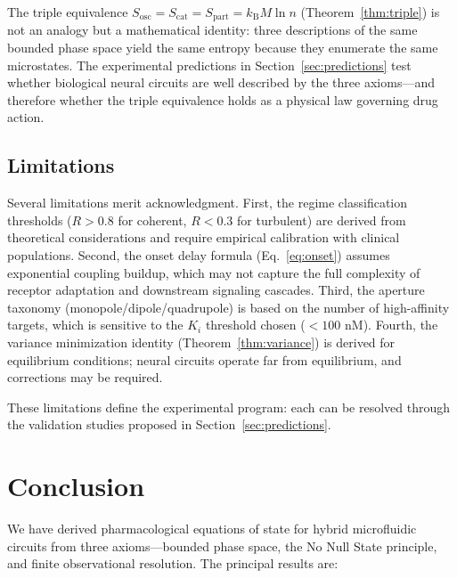 \documentclass[twocolumn,10pt]{article}
\theoremstyle{remark}
\newcommand{\Sosc}{S_{\mathrm{osc}}}
\newcommand{\Scat}{S_{\mathrm{cat}}}
\newcommand{\Spart}{S_{\mathrm{part}}}
\newcommand{\kB}{k_{\mathrm{B}}}
\newcommand{\Rorder}{R}
\begin{document}
The triple equivalence $\Sosc = \Scat = \Spart = \kB M \ln n$ (Theorem~\ref{thm:triple}) is not an analogy but a mathematical identity: three descriptions of the same bounded phase space yield the same entropy because they enumerate the same microstates. The experimental predictions in Section~\ref{sec:predictions} test whether biological neural circuits are well described by the three axioms---and therefore whether the triple equivalence holds as a physical law governing drug action.

\subsection{Limitations}

Several limitations merit acknowledgment. First, the regime classification thresholds ($\Rorder > 0.8$ for coherent, $\Rorder < 0.3$ for turbulent) are derived from theoretical considerations and require empirical calibration with clinical populations. Second, the onset delay formula (Eq.~\ref{eq:onset}) assumes exponential coupling buildup, which may not capture the full complexity of receptor adaptation and downstream signaling cascades. Third, the aperture taxonomy (monopole/dipole/quadrupole) is based on the number of high-affinity targets, which is sensitive to the $K_i$ threshold chosen ($< 100$ nM). Fourth, the variance minimization identity (Theorem~\ref{thm:variance}) is derived for equilibrium conditions; neural circuits operate far from equilibrium, and corrections may be required.

These limitations define the experimental program: each can be resolved through the validation studies proposed in Section~\ref{sec:predictions}.

\section{Conclusion}
\label{sec:conclusion}

We have derived pharmacological equations of state for hybrid microfluidic circuits from three axioms---bounded phase space, the No Null State principle, and finite observational resolution. The principal results are:
\end{document}
